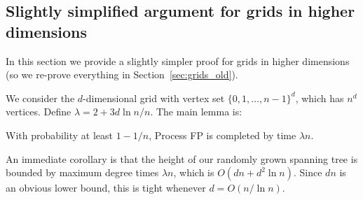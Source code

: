 \documentclass[lotsofwhite]{patmorin}
\begin{document}
\subsection{Slightly simplified argument for grids in higher dimensions}
\newcommand{\prob}[1]
{\Pr\left\{ #1\right\}}

In this section we provide a slightly simpler proof for grids in higher dimensions (so we re-prove everything in Section~\ref{sec:grids_old}).

We consider the $d$-dimensional grid with vertex set
$\{0,1,\dots,n-1\}^d$, which has $n^d$ vertices.
Define $\lambda = 2 + 3 d \ln n / n$.
The main lemma is:
\begin{lem}\label{lem:gridcovertime}
With probability at least $1-1/n$,
Process FP is completed by time $\lambda n$.
\end{lem}

An immediate corollary is that the height of our randomly grown spanning tree is bounded by maximum degree times $\lambda n$, which is $O(dn + d^2 \ln n)$.
Since $dn$ is an obvious lower bound, this is tight whenever $d = O( n/\ln n)$.
\end{document}
